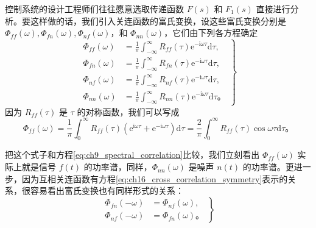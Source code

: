 控制系统的设计工程师们往往愿意选取传递函数 $F(s)$ 和 $F_1(s)$ 直接进行分析。要这样做的话，我们引入关连函数的富氏变换，设这些富氏变换分别是 $\Phi_{ff}(\omega),\Phi_{fn}(\omega),\Phi_{nf}(\omega)$，和 $\Phi_{nn}(\omega)$，它们由下列各方程确定
\begin{equation}
\left.
\begin{aligned}
\Phi_{ff}(\omega) &= \frac{1}{\pi}\int_{-\infty}^{\infty} R_{ff}(\tau)\mathrm{e}^{-\mathrm{i}\omega\tau}\mathrm{d}\tau, \\
\Phi_{fn}(\omega) &= \frac{1}{\pi}\int_{-\infty}^{\infty} R_{fn}(\tau)\mathrm{e}^{-\mathrm{i}\omega\tau}\mathrm{d}\tau, \\
\Phi_{nf}(\omega) &= \frac{1}{\pi}\int_{-\infty}^{\infty} R_{nf}(\tau)\mathrm{e}^{-\mathrm{i}\omega\tau}\mathrm{d}\tau, \\
\Phi_{nn}(\omega) &= \frac{1}{\pi}\int_{-\infty}^{\infty} R_{nn}(\tau)\mathrm{e}^{-\mathrm{i}\omega\tau}\mathrm{d}\tau。
\end{aligned}
\right\}
\label{eq:ch16_correlation_fourier_transforms}
\end{equation}
因为 $R_{ff}(\tau)$ 是 $\tau$ 的对称函数，我们可以写成
\begin{equation*}
\Phi_{ff}(\omega) = \frac{1}{\pi}\int_{0}^{\infty} R_{ff}(\tau)(\mathrm{e}^{\mathrm{i}\omega\tau}+\mathrm{e}^{-\mathrm{i}\omega\tau})\mathrm{d}\tau = \frac{2}{\pi}\int_{0}^{\infty} R_{ff}(\tau)\cos\omega\tau\mathrm{d}\tau。
\end{equation*}

把这个式子和方程\eqref{eq:ch9_spectral_correlation}比较，我们立刻看出 $\Phi_{ff}(\omega)$ 实际上就是信号 $f(t)$ 的功率谱，同样，$\Phi_{nn}(\omega)$ 是噪声 $n(t)$ 的功率谱。更进一步，因为互相关连函数有方程\eqref{eq:ch16_cross_correlation_symmetry}表示的关系，很容易看出富氏变换也有同样形式的关系：
\begin{equation}
\left.
\begin{aligned}
\Phi_{fn}(-\omega) &= \Phi_{nf}(\omega), \\
\Phi_{nf}(-\omega) &= \Phi_{fn}(\omega)。
\end{aligned}
\right\}
\label{eq:ch16_cross_spectrum_symmetry}
\end{equation}

